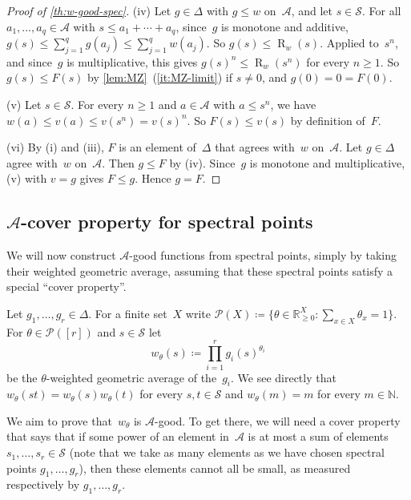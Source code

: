 \documentclass[11pt,letterpaper]{article}
\DeclareMathOperator{\tensorrank}{R}
\newcommand{\RR}{\mathbb{R}}
\newcommand{\NN}{\mathbb{N}}
\begin{document}
\begin{proof}[Proof of \cref{th:w-good-spec}]
(iv) Let $g \in \Delta$ with $g \leq w$ on~$\mathcal{A}$, and let $s \in \mathcal{S}$. For all $a_1, \ldots, a_q \in \mathcal{A}$ with $s \leq a_1 + \cdots + a_q$, since~$g$ is monotone and additive, $g(s) \leq \sum_{j=1}^q g(a_j) \leq \sum_{j=1}^q w(a_j)$. So $g(s) \leq \tensorrank_w(s)$. Applied to~$s^n$, and since~$g$ is multiplicative, this gives $g(s)^n \leq \tensorrank_w(s^n)$ for every $n \geq 1$. So $g(s) \leq F(s)$ by \cref{lem:MZ}~(\ref{it:MZ-limit}) if $s \neq 0$, and $g(0) = 0 = F(0)$.

(v) Let $s \in \mathcal{S}$. For every $n \geq 1$ and $a \in \mathcal{A}$ with $a \leq s^n$, we have $w(a) \leq v(a) \leq v(s^n) = v(s)^n$. So $F(s) \leq v(s)$ by definition of~$F$.

(vi) By (i) and (iii), $F$ is an element of~$\Delta$ that agrees with~$w$ on~$\mathcal{A}$. Let $g \in \Delta$ agree with~$w$ on~$\mathcal{A}$. Then $g \leq F$ by (iv). Since~$g$ is monotone and multiplicative, (v) with $v = g$ gives $F \leq g$. Hence $g = F$.
\end{proof}

\subsection{\texorpdfstring{$\mathcal{A}$}{A}-cover property for spectral points}

We will now construct $\mathcal{A}$-good functions from spectral points, simply by taking their weighted geometric average, assuming that these spectral points satisfy a special ``cover property''.

Let $g_1, \ldots, g_r \in \Delta$.
For a finite set~$X$ write $\mathcal{P}(X) \coloneqq \{\theta \in \RR_{\geq0}^X : \sum_{x \in X} \theta_x = 1\}$.
For $\theta \in \mathcal{P}([r])$ and $s \in \mathcal{S}$ let
\[
w_\theta(s) \coloneqq \prod_{i=1}^r g_i(s)^{\theta_i}
\]
be the $\theta$-weighted geometric average of the~$g_i$.
We see directly that
$w_\theta(st) = w_\theta(s)w_\theta(t)$ for every $s,t \in \mathcal{S}$ and $w_\theta(m) = m$ for every $m \in \NN$. 

We aim to prove that~$w_\theta$ is $\mathcal{A}$-good. To get there, we will need a cover property that says that if some power of an element in~$\mathcal{A}$ is at most a sum of elements $s_1, \ldots, s_r \in \mathcal{S}$ (note that we take as many elements as we have chosen spectral points $g_1, \ldots, g_r$), then these elements cannot all be small, as measured respectively by $g_1, \ldots, g_r$.
\end{document}
